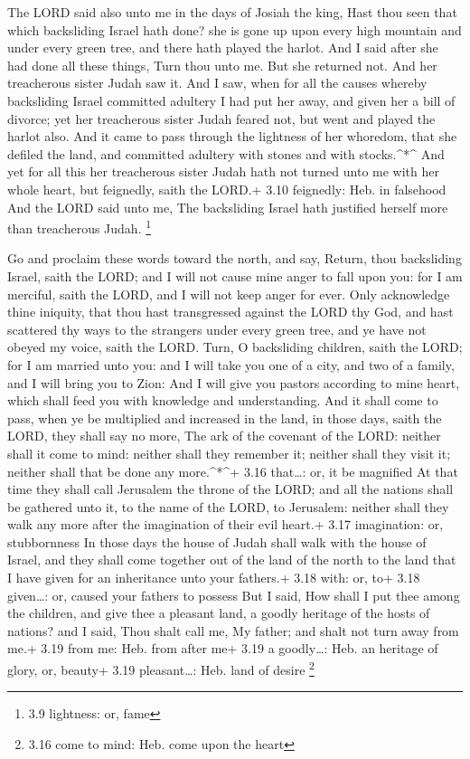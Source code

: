  The LORD said also unto me in the days of Josiah the king,
Hast thou seen that which backsliding Israel hath done? she is gone up
upon every high mountain and under every green tree, and there hath
played the harlot.  And I said after she had done all these
things, Turn thou unto me. But she returned not. And her treacherous
sister Judah saw it.  And I saw, when for all the causes
whereby backsliding Israel committed adultery I had put her away, and
given her a bill of divorce; yet her treacherous sister Judah feared
not, but went and played the harlot also.  And it came to
pass through the lightness of her whoredom, that she defiled the land,
and committed adultery with stones and with stocks.\^{}*\^{}
 And yet for all this her treacherous sister Judah hath not
turned unto me with her whole heart, but feignedly, saith the LORD.+
3.10 feignedly: Heb. in falsehood  And the LORD said unto
me, The backsliding Israel hath justified herself more than treacherous
Judah. \footnote{3.9 lightness: or, fame}

 Go and proclaim these words toward the north, and say,
Return, thou backsliding Israel, saith the LORD; and I will not cause
mine anger to fall upon you: for I am merciful, saith the LORD, and I
will not keep anger for ever.  Only acknowledge thine
iniquity, that thou hast transgressed against the LORD thy God, and hast
scattered thy ways to the strangers under every green tree, and ye have
not obeyed my voice, saith the LORD.  Turn, O backsliding
children, saith the LORD; for I am married unto you: and I will take you
one of a city, and two of a family, and I will bring you to Zion:
 And I will give you pastors according to mine heart, which
shall feed you with knowledge and understanding.  And it
shall come to pass, when ye be multiplied and increased in the land, in
those days, saith the LORD, they shall say no more, The ark of the
covenant of the LORD: neither shall it come to mind: neither shall they
remember it; neither shall they visit it; neither shall that be done any
more.\^{}*\^{}+ 3.16 that\ldots: or, it be magnified  At
that time they shall call Jerusalem the throne of the LORD; and all the
nations shall be gathered unto it, to the name of the LORD, to
Jerusalem: neither shall they walk any more after the imagination of
their evil heart.+ 3.17 imagination: or, stubbornness  In
those days the house of Judah shall walk with the house of Israel, and
they shall come together out of the land of the north to the land that I
have given for an inheritance unto your fathers.+ 3.18 with: or, to+
3.18 given\ldots: or, caused your fathers to possess  But I
said, How shall I put thee among the children, and give thee a pleasant
land, a goodly heritage of the hosts of nations? and I said, Thou shalt
call me, My father; and shalt not turn away from me.+ 3.19 from me: Heb.
from after me+ 3.19 a goodly\ldots: Heb. an heritage of glory, or,
beauty+ 3.19 pleasant\ldots: Heb. land of desire \footnote{3.16 come to
  mind: Heb. come upon the heart}


